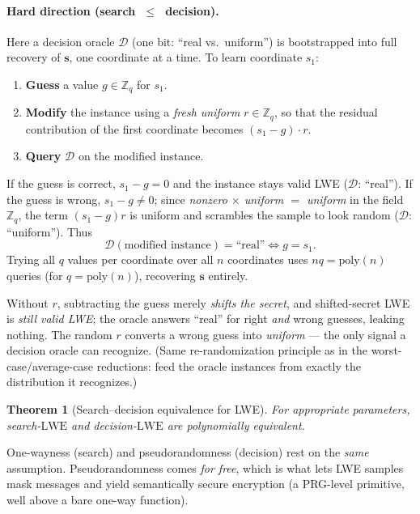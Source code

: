 \documentclass[11pt]{article}
\theoremstyle{definition}
\theoremstyle{plain}
\newtheorem{theorem}[definition]{Theorem}
\theoremstyle{remark}
\newcommand{\Z}{\mathbb{Z}}
\newcommand{\Zq}{\Z_q}
\newcommand{\vs}{\mathbf{s}}
\newcommand{\lwe}{\mathrm{LWE}}
\newcommand{\reduces}{\;\leq\;}
\newcommand{\poly}{\mathrm{poly}}
\begin{document}
\paragraph{Hard direction (search \texorpdfstring{$\reduces$}{<=} decision).}
Here a decision oracle $\mathcal D$ (one bit: ``real vs.\ uniform'') is bootstrapped into
full recovery of $\vs$, one coordinate at a time. To learn coordinate $s_1$:
\begin{enumerate}[leftmargin=1.6em,nosep]
  \item \textbf{Guess} a value $g\in\Zq$ for $s_1$.
  \item \textbf{Modify} the instance using a \emph{fresh uniform} $r\in\Zq$, so that the
        residual contribution of the first coordinate becomes $(s_1-g)\cdot r$.
  \item \textbf{Query} $\mathcal D$ on the modified instance.
\end{enumerate}
If the guess is correct, $s_1-g=0$ and the instance stays valid LWE ($\mathcal D$:
``real''). If the guess is wrong, $s_1-g\neq 0$; since \emph{nonzero $\times$ uniform
$=$ uniform} in the field $\Zq$, the term $(s_1-g)r$ is uniform and scrambles the sample to
look random ($\mathcal D$: ``uniform''). Thus
\[
   \mathcal D(\text{modified instance}) = \text{``real''} \iff g = s_1 .
\]
Trying all $q$ values per coordinate over all $n$ coordinates uses $nq=\poly(n)$ queries
(for $q=\poly(n)$), recovering $\vs$ entirely.

\begin{keybox}
Without $r$, subtracting the guess merely \emph{shifts the secret}, and shifted-secret LWE is
\emph{still valid LWE}; the oracle answers ``real'' for right \emph{and} wrong guesses,
leaking nothing. The random $r$ converts a wrong guess into \emph{uniform} --- the only
signal a decision oracle can recognize. (Same re-randomization principle as in the
worst-case/average-case reductions: feed the oracle instances from exactly the distribution
it recognizes.)
\end{keybox}

\begin{theorem}[Search--decision equivalence for LWE]
For appropriate parameters, search-$\lwe$ and decision-$\lwe$ are polynomially equivalent.
\end{theorem}

\begin{keybox}[Consequence]
One-wayness (search) and pseudorandomness (decision) rest on the \emph{same} assumption.
Pseudorandomness comes \emph{for free}, which is what lets LWE samples mask messages and
yield semantically secure encryption (a PRG-level primitive, well above a bare one-way
function).
\end{keybox}
\end{document}
